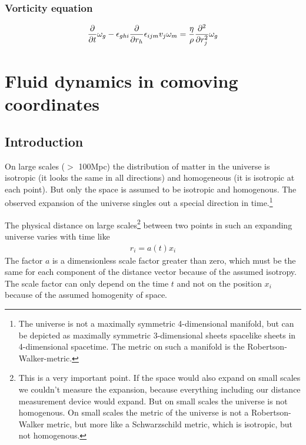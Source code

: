 \subsubsection*{Vorticity equation}
\begin{align}
\frac{\partial}{\partial t}\omega_g
-\epsilon_{ghi}\frac{\partial}{\partial r_h} \epsilon_{ijm} v_j \omega_m =
\frac{\eta}{\rho}\frac{\partial^2}{\partial r_j^2}\omega_g
\end{align}

\section{Fluid dynamics in comoving coordinates}
\subsection{Introduction}
On large scales ($>$ 100Mpc) the distribution of matter 
in the universe is isotropic (it looks the same in all directions) 
and homogeneous (it is isotropic at each point). But only the space 
is assumed to be isotropic and homogenous. The observed expansion of 
the universe singles out a special direction in time.\footnote{The 
universe is not a maximally symmetric 4-dimensional manifold, but can be 
depicted as maximally symmetric 3-dimensional sheets spacelike sheets 
in 4-dimensional spacetime. The metric on such a manifold is the 
Robertson-Walker-metric.}

The physical distance on large scales\footnote{This is a very important 
point. If the space would also
expand on small scales we couldn't measure the expansion, because everything 
including our distance measurement device would expand. But on small scales
the universe is not homogenous. On small scales the metric of the universe is 
not a Robertson-Walker metric, but more like a Schwarzschild metric, which
is isotropic, but not homogenous.} 
between two points in such an expanding universe varies with time like
\begin{align}
r_i=a(t) x_i
\end{align}
The factor $a$ is a dimensionless scale factor greater than zero, which must 
be the same for each component of the distance vector because of the assumed isotropy.
The scale factor can only depend on the time $t$ and not on the position
$x_i$ because of the assumed homogenity of space. 

